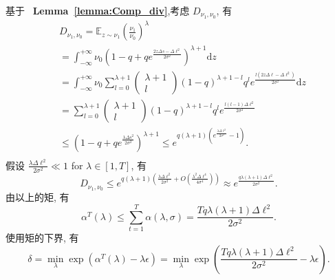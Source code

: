 基于 ~\textbf{Lemma~\ref{lemma:Comp_div}},考虑 $D_{\nu_{1},\nu_{0}}$, 有
\begin{equation}
\begin{aligned}
&D_{\nu_{1},\nu_{0}}=\mathbb{E}_{z\sim \nu_{1}}\left(\frac{\nu_{1}}{\nu_{0}}\right)^{\lambda}\\
&=\int_{-\infty}^{+\infty} \nu_0\left(1-q+qe^{\frac{2z\Delta s-\Delta \ell^{2}}{2\sigma^{2}}}\right)^{\lambda+1} \mathrm{d}z\\
&=\int_{-\infty}^{+\infty} \nu_0
\sum_{l=0}^{\lambda+1}\left(\begin{matrix}\lambda+1\\ l\end{matrix}\right)(1-q)^{\lambda+1-l}q^le^{\frac{l\left(2z\Delta\ell-\Delta \ell^{2}\right)}{2\sigma^{2}}}\mathrm{d}z\\
&=
\sum_{l=0}^{\lambda+1}\left(\begin{matrix}\lambda+1\\ l\end{matrix}\right)(1-q)^{\lambda+1-l}q^{l}e^{\frac{l(l-1)\Delta \ell^{2}}{2\sigma^{2}}}\\
&\leq\left(1-q+qe^{\frac{\lambda\Delta s^{2}}{2\sigma^{2}}}\right)^{\lambda+1}\leq e^{q(\lambda+1)\left(e^{\frac{\lambda\Delta \ell^{2}}{2\sigma^{2}}}-1\right)}.\\
\end{aligned}
\end{equation}
假设 $\frac{\lambda\Delta\ell^{2}}{2\sigma^{2}}\ll1$ for $\lambda \in [1,T]$, 有
\begin{equation}\label{equ:divergence_bound}
D_{\nu_{1},\nu_{0}} \leq e^{q(\lambda+1)\left(\frac{\lambda\Delta\ell^{2}}{2\sigma^{2}}+O\left(\frac{\lambda^{2}\Delta \ell^{4}}{4\sigma^{4}}\right)\right)}\approx e^{\frac{q\lambda(\lambda+1)\Delta\ell^{2}}{2\sigma^{2}}}.
\end{equation}
由以上的矩, 有
\begin{equation}\label{equ:moments}
\alpha^{T}(\lambda) \leq \sum_{t=1}^{T}\alpha(\lambda, \sigma)=\frac{Tq\lambda(\lambda+1)\Delta\ell^{2}}{2\sigma^{2}}.
\end{equation}
使用矩的下界\cite{abadi2016DLwithDP}, 有
\begin{equation} 
\delta = \min_{\lambda}\exp\left(\alpha^{T}(\lambda)-\lambda\epsilon\right)
=\min_{\lambda}\exp\left(\frac{Tq\lambda(\lambda+1)\Delta\ell^2}{2\sigma^2}-\lambda\epsilon\right).
\end{equation}


